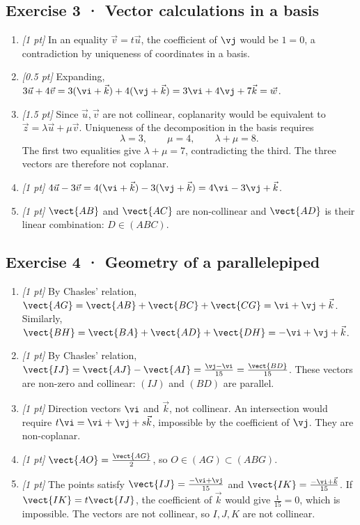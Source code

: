\subsection*{Exercise 3 · Vector calculations in a basis}\begin{enumerate}

\item \textit{[1 pt]} In an equality $\vec v=t\vec u$, the coefficient of $\vj $ would be $1=0$, a contradiction by uniqueness of coordinates in a basis.

\item \textit{[0.5 pt]} Expanding, $3\vec u+4\vec v=3(\vi +\vec k)+4(\vj +\vec k)=3\vi +4\vj +7\vec k=\vec w$.

\item \textit{[1.5 pt]} Since $\vec u,\vec v$ are not collinear, coplanarity would be equivalent to $\vec z=\lambda\vec u+\mu\vec v$. Uniqueness of the decomposition in the basis requires
\[\lambda=3,\qquad\mu=4,\qquad\lambda+\mu=8.\]
The first two equalities give $\lambda+\mu=7$, contradicting the third. The three vectors are therefore not coplanar.

\item \textit{[1 pt]} $4\vec u-3\vec v=4(\vi +\vec k)-3(\vj +\vec k)=4\vi -3\vj +\vec k$.

\item \textit{[1 pt]} $\vect{AB}$ and $\vect{AC}$ are non-collinear and $\vect{AD}$ is their linear combination: $D\in(ABC)$.

\end{enumerate}

\subsection*{Exercise 4 · Geometry of a parallelepiped}\begin{enumerate}

\item \textit{[1 pt]} By Chasles' relation, $\vect{AG}=\vect{AB}+\vect{BC}+\vect{CG}=\vi +\vj +\vec k$. Similarly, $\vect{BH}=\vect{BA}+\vect{AD}+\vect{DH}=-\vi +\vj +\vec k$.

\item \textit{[1 pt]} By Chasles' relation, $\vect{IJ}=\vect{AJ}-\vect{AI}=\frac{\vj -\vi }{15}=\frac{\vect{BD}}{15}$. These vectors are non-zero and collinear: $(IJ)$ and $(BD)$ are parallel.

\item \textit{[1 pt]} Direction vectors $\vi $ and $\vec k$, not collinear. An intersection would require $t\vi =\vi +\vj +s\vec k$, impossible by the coefficient of $\vj $. They are non-coplanar.

\item \textit{[1 pt]} $\vect{AO}=\frac{\vect{AG}}{2}$, so $O\in(AG)\subset(ABG)$.

\item \textit{[1 pt]} The points satisfy $\vect{IJ}=\frac{-\vi +\vj }{15}$ and $\vect{IK}=\frac{-\vi +\vec k}{15}$. If $\vect{IK}=t\vect{IJ}$, the coefficient of $\vec k$ would give $\frac{1}{15}=0$, which is impossible. The vectors are not collinear, so $I,J,K$ are not collinear.

\end{enumerate}

